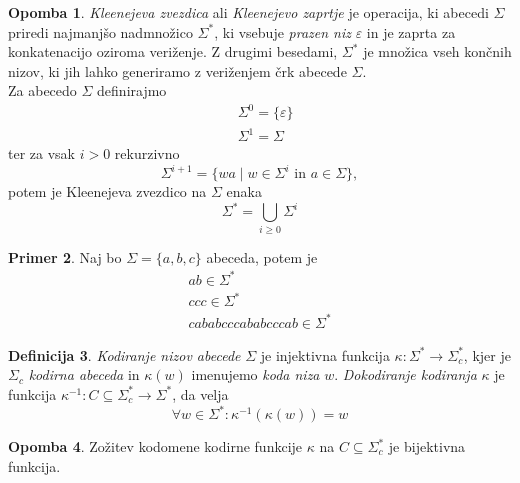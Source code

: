 \documentclass{amsart}
\theoremstyle{definition} %
\newtheorem{definicija}{Definicija}[section]
\newtheorem{primer}[definicija]{Primer}
\newtheorem{opomba}[definicija]{Opomba}
\theoremstyle{plain} %
\begin{document}
\begin{opomba}
    
    \textit{Kleenejeva zvezdica} ali \textit{Kleenejevo zaprtje} je operacija, ki
    abecedi $ \Sigma $ priredi najmanjšo nadmnožico $ \Sigma^* $, ki vsebuje
    \textit{prazen niz} $ \varepsilon $ in je zaprta za konkatenacijo oziroma veriženje.
    Z drugimi besedami, $ \Sigma^* $ je množica vseh končnih nizov, ki
    jih lahko generiramo z veriženjem črk abecede $ \Sigma $. \\
    Za abecedo $ \Sigma $ definirajmo
    \begin{align*}
        & \Sigma^0 = \{ \varepsilon \} \\
        & \Sigma^1 = \Sigma
    \end{align*}
    ter za vsak $ i > 0 $ rekurzivno
    \[
        \Sigma^{i+1} = \{ wa \mid w \in \Sigma^i \text{ in } a \in \Sigma \},
    \]
    potem je Kleenejeva zvezdico na $ \Sigma $ enaka
    \[
        \Sigma^* = \bigcup_{i \geq 0} \Sigma^i
    \]

\end{opomba}

\begin{primer}
    
    Naj bo $ \Sigma = \{ a,b,c \} $ abeceda, potem je
    \begin{gather*} 
        ab \in \Sigma^* \\
        ccc \in \Sigma^* \\
        cababcccababcccab \in \Sigma^*
    \end{gather*}

\end{primer}

\begin{definicija}
    
    \textit{Kodiranje nizov abecede} $ \Sigma $ je injektivna funkcija $ \kappa \colon \Sigma^* 
    \to \Sigma_c^* $, kjer je $ \Sigma_c $ \textit{kodirna abeceda} in $ \kappa(w) $ imenujemo
    \textit{koda niza} $ w $. \textit{Dokodiranje kodiranja} $ \kappa $ je funkcija 
    $ \kappa^{-1} \colon C \subseteq \Sigma^*_c \to \Sigma^* $, da velja
    \[
        \forall w \in \Sigma^* \colon \kappa^{-1}(\kappa(w)) = w
    \]

\end{definicija}

\begin{opomba}
    
    Zožitev kodomene kodirne funkcije $ \kappa $ na $ C \subseteq \Sigma^*_c $ je bijektivna funkcija.

\end{opomba}
\end{document}
